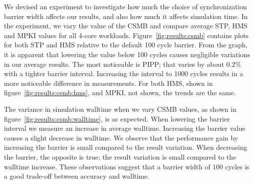 We devised an experiment to investigate how much the choice of synchronization barrier width affects our results, and also how much it affects simulation time.
In the experiment, we vary the value of the CSMB and compare average STP, HMS and MPKI values for all 4-core workloads.
Figure~\ref{fig:results:csmb} contains plots for both STP and HMS relative to the default 100 cycle barrier.
From the graph, it is apparent that lowering the value below 100 cycles causes negligible variations in our average results. 
The most noticeable is PIPP; that varies by about 0.2\% with a tighter barrier interval.
Increasing the interval to 1000 cycles results in a more noticeable difference in measurements.
For both HMS, shown in figure~\ref{fig:results:csmb:hms}, and MPKI, not shown, the trends are the same.

The variance in simulation walltime when we vary CSMB values, as shown in figure~\ref{fig:results:csmb:walltime}, is as expected. 
When lowering the barrier interval we measure an increase in average walltime.
Increasing the barrier value causes a slight decrease in walltime.
We observe that the performance gain by increasing the barrier is small compared to the result variation. 
When decreasing the barrier, the opposite is true; the result variation is small compared to the walltime increase.
These observations suggest that a barrier width of 100 cycles is a good trade-off between accuracy and walltime.
